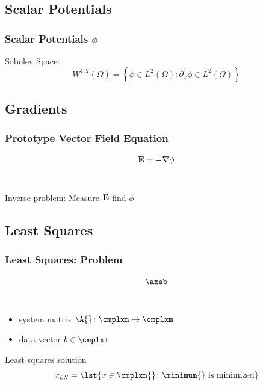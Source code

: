 \documentclass[handout]{beamer}
\begin{document}
\subsection{Scalar Potentials}

\begin{frame}      %
\frametitle{Scalar Potentials $\phi$}
  Sobolev Space:
$$W^{1,2}\left( \Omega \right) = \left\{ \phi\in L^{2}\left( \Omega \right)\colon \partial_{x}^{1}\phi\in L^{2}\left( \Omega \right) \right\}$$
\end{frame}

\subsection{Gradients}

\begin{frame}      %
\frametitle{Prototype Vector Field Equation}
  $$\bf{E} = - \nabla \phi$$ \\[20pt]
  \onedot
  \pause
  \begin{center}
    Inverse problem: Measure $\bf{E}$ find $\phi$
  \end{center}
  \onedot
\end{frame}

\subsection{Least Squares}

\begin{frame}      %
\frametitle{Least Squares: Problem}
  $$\axeb$$\\[0pt]
  \begin{itemize}
		\item system matrix $\A{}\colon \cmplxn \mapsto \cmplxm$
		\item data vector $b \in \cmplxm$
	\end{itemize}
	Least squares solution
	$$x_{LS} = \lst{ x\in\cmplxn{} \colon \minimum{} \text{ is minimized} }$$
\end{frame}
\end{document}
